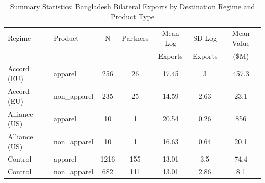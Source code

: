 \begin{table}[t]
\centering
\caption{Summary Statistics: Bangladesh Bilateral Exports by Destination Regime and Product Type}
\label{tab:summary}
\begin{tabular}{llccccc}
\toprule
Regime & Product & N & Partners & Mean Log & SD Log & Mean Value \\
       &         &   &          & Exports  & Exports & (\$M) \\
\midrule
Accord (EU) & apparel & 256 & 26 & 17.45 & 3 & 457.3 \\
Accord (EU) & non_apparel & 235 & 25 & 14.59 & 2.63 & 23.1 \\
Alliance (US) & apparel & 10 & 1 & 20.54 & 0.26 & 856 \\
Alliance (US) & non_apparel & 10 & 1 & 16.63 & 0.64 & 20.1 \\
Control & apparel & 1216 & 155 & 13.01 & 3.5 & 74.4 \\
Control & non_apparel & 682 & 111 & 13.01 & 2.86 & 8.1 \\
\bottomrule
\end{tabular}
\par{}
\end{table}

